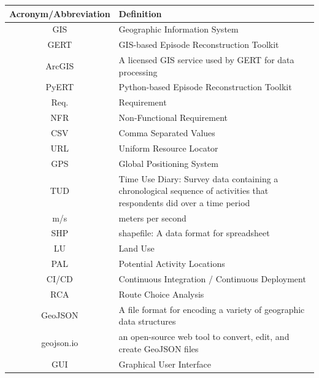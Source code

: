 \documentclass[12pt, titlepage]{article}
\begin{document}
\renewcommand{\arraystretch}{1.2}
\begin{tabular}{|c|p{10cm}|}
 \hline
 {\bf Acronym/Abbreviation} & {\bf Definition} \\
 \hline
 GIS & Geographic Information System \\
 \hline
 GERT & GIS-based Episode Reconstruction Toolkit  \\ 
\hline
 ArcGIS & A licensed GIS service used by GERT for data processing \\
 \hline
 PyERT & Python-based Episode Reconstruction Toolkit  \\ 
 \hline
 Req. & Requirement  \\
 \hline
 NFR & Non-Functional Requirement  \\
 \hline 
 CSV & Comma Separated Values \\
 \hline
 URL & Uniform Resource Locator \\
 \hline
 GPS & Global Positioning System \\
 \hline
 TUD & Time Use Diary:  Survey data containing a chronological sequence of activities that respondents did over a time period\\
 \hline
 m/s & meters per second\\
 \hline
 SHP & shapefile: A data format for spreadsheet \\ 
 \hline
 LU & Land Use \\ 
 \hline
 PAL & Potential Activity Locations \\ 
 \hline
 CI/CD & Continuous Integration / Continuous Deployment\\
 \hline
 RCA & Route Choice Analysis \\
 \hline
 GeoJSON & A file format for encoding a variety of geographic data structures\\
 \hline
 geojson.io & an open-source web tool to convert, edit, and create GeoJSON files\\
 \hline
 GUI & Graphical User Interface \\
 \hline
\end{tabular}\\

\newpage

\tableofcontents

\newpage

\listoftables

\listoffigures

\newpage

\end{document}
